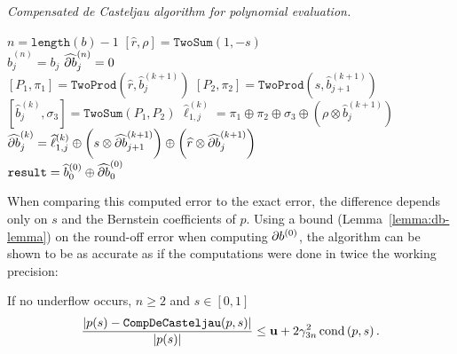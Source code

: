 \begin{breakablealgorithm}
  \caption{\textit{Compensated de Casteljau algorithm for polynomial evaluation.}}
  \label{alg:comp-de-casteljau}

  \begin{algorithmic}
      \State \(n = \texttt{length}(b) - 1\)
      \State \(\left[\widehat{r}, \rho\right] = \mathtt{TwoSum}(1, -s)\)
      \\
        \State \(\widehat{b}_j^{(n)} = b_j\)
        \State \(\cdb{1}_j^{(n)} = 0\)
      \EndFor
      \\
          \State \(\left[P_1, \pi_1\right] = \mathtt{TwoProd}\left(
              \widehat{r}, \widehat{b}_j^{(k + 1)}\right)\)
          \State \(\left[P_2, \pi_2\right] = \mathtt{TwoProd}\left(
              s, \widehat{b}_{j + 1}^{(k + 1)}\right)\)
          \State \(\left[\widehat{b}_j^{(k)}, \sigma_3\right] =
              \mathtt{TwoSum}(P_1, P_2)\)
          \State \(\widehat{\ell}_{1, j}^{(k)} = \pi_1 \oplus \pi_2 \oplus
              \sigma_3 \oplus \left(\rho \otimes
              \widehat{b}_j^{(k + 1)}\right)\)
          \State \(\cdb{1}_j^{(k)} =
              \widehat{\ell}_{1, j}^{(k)} \oplus
              \left(s \otimes \cdb{1}_{j + 1}^{(k + 1)}
              \right) \oplus
              \left(\widehat{r} \otimes
              \cdb{1}_j^{(k + 1)}\right)\)
        \EndFor
      \EndFor
      \\
      \State \(\mathtt{result} = \widehat{b}_0^{(0)} \oplus
          \cdb{1}_0^{(0)}\)
    \EndFunction
  \end{algorithmic}
\end{breakablealgorithm}

\noindent  When comparing this computed error to the exact error, the
difference depends only on \(s\) and the Bernstein
coefficients of \(p\). Using a bound (Lemma~\ref{lemma:db-lemma}) on the
round-off error when computing \(\db{1}^{(0)}\), the algorithm can
be shown to be as accurate as if the computations were done in twice
the working precision:

\begin{theorem}
  If no underflow occurs, \(n \geq 2\) and \(s \in \left[0, 1\right]\)
  \begin{equation}
    \frac{\left|p(s) - \mathtt{CompDeCasteljau}(p, s)\right|}{
      \left|p(s)\right|} \leq \mathbf{u} + 2 \gamma_{3n}^2 \operatorname{cond}\left(p, s\right).
  \end{equation}
\end{theorem}

